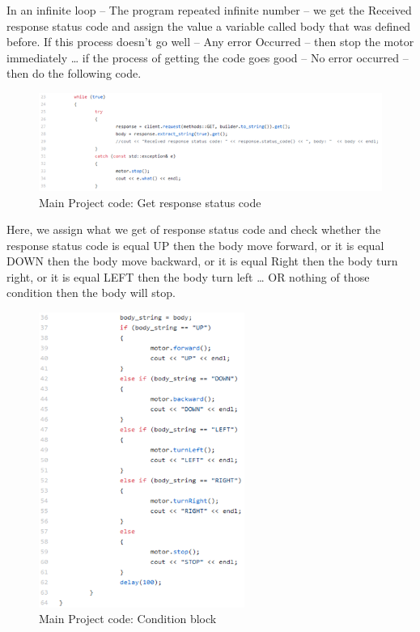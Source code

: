 \documentclass{article}
\begin{document}
\newpage

In an infinite loop – The program repeated infinite number – we get the Received response status code and assign the value a variable called body that was defined before. If this process doesn’t go well – Any error Occurred – then stop the motor immediately … if the process of getting the code goes good – No error occurred – then do the following code. 

\begin{figure}[h]
    \centering
    \includegraphics{figures/69.png}
    \caption{Main Project code: Get response status code}
    \label{fig:my_label}
\end{figure}

\newpage

Here, we assign what we get of response status code and check whether the response status code is equal UP then the body move forward, or it is equal DOWN then the body move backward, or it is equal Right then the body turn right, or it is equal LEFT then the body turn left … OR nothing of those condition then the body will stop.

\begin{figure}[h]
    \centering
    \includegraphics[width=0.6\textwidth]{figures/70.png}
    \caption{Main Project code: Condition block}
    \label{fig:my_label}
\end{figure}
\end{document}
